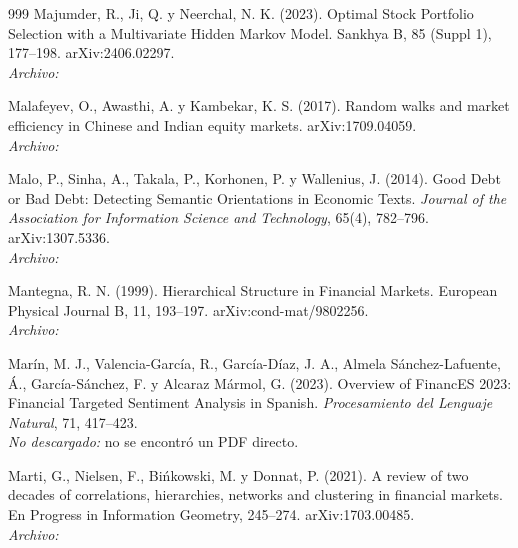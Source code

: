 \begin{thebibliography}{999}
Majumder, R., Ji, Q. y Neerchal, N. K. (2023). Optimal Stock Portfolio Selection with a Multivariate Hidden Markov Model. Sankhya B, 85 (Suppl 1), 177–198. arXiv:2406.02297.
\\\textit{Archivo:} 

Malafeyev, O., Awasthi, A. y Kambekar, K. S. (2017). Random walks and market efficiency in Chinese and Indian equity markets. arXiv:1709.04059.
\\\textit{Archivo:} 

Malo, P., Sinha, A., Takala, P., Korhonen, P. y Wallenius, J. (2014). Good Debt or Bad Debt: Detecting Semantic Orientations in Economic Texts. \emph{Journal of the Association for Information Science and Technology}, 65(4), 782--796. arXiv:1307.5336.
\\\textit{Archivo:} 

Mantegna, R. N. (1999). Hierarchical Structure in Financial Markets. European Physical Journal B, 11, 193–197. arXiv:cond-mat/9802256.
\\\textit{Archivo:} 

Mar{\'i}n, M. J., Valencia-Garc{\'i}a, R., Garc{\'i}a-D{\'i}az, J. A., Almela S{\'a}nchez-Lafuente, \'A., Garc{\'i}a-S{\'a}nchez, F. y Alcaraz M{\'a}rmol, G. (2023). Overview of {FinancES} 2023: Financial Targeted Sentiment Analysis in {Spanish}. \emph{Procesamiento del Lenguaje Natural}, 71, 417--423.
\\\textit{No descargado:} no se encontró un PDF directo.

Marti, G., Nielsen, F., Bińkowski, M. y Donnat, P. (2021). A review of two decades of correlations, hierarchies, networks and clustering in financial markets. En Progress in Information Geometry, 245–274. arXiv:1703.00485.
\\\textit{Archivo:} 


\end{thebibliography}
